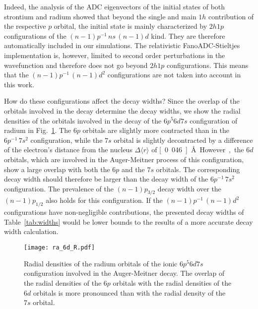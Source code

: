 \documentclass[aps,amssymb,preprint,a4paper,longbibliography]{revtex4}
\begin{document}
Indeed, the analysis of the ADC eigenvectors of the initial states of both
strontium and radium showed
that beyond the single and main $1h$ contribution of the respective $p$ orbital, the
initial state is mainly characterized by $2h1p$ configurations of the
$(n-1)p^{-1} \,ns \, (n-1)d$ kind. They
are therefore automatically included in our simulations.
The
{relativistic}
FanoADC-Stieltjes
{implementation}
is, however, limited
to second order perturbations in the wavefunction
and therefore does not go beyond $2h1p$ configurations. This means that the
$(n-1)p^{-1} \,(n-1)d^2$ configurations are not taken into account in this work.

How do these configurations affect the decay widths? Since the overlap of the
orbitals involved in the decay determine the decay widths, we show the
radial densities of the orbitals involved in the decay of the $6p^5 6d 7s$
configuration of radium in Fig.~\ref{fig:radial_ra}.
The $6p$ orbitals are slightly more contracted than in the $6p^{-1} \,7s^2$
configuration, while the $7s$ orbital is slightly decontracted by a difference
of the electron's distance from the nucleus $\Delta \langle r \rangle$
of \unit[0.046]{\AA}.
However, the $6d$ orbitals, which are involved
in the Auger-Meitner process of this configuration, show a large overlap with both
the $6p$ and the $7s$ orbitals. The corresponding decay width should therefore
be larger than the decay width of the $6p^{-1} \,7s^2$ configuration.
The prevalence of the $(n-1)p_{3/2}$ decay width over the $(n-1)p_{1/2}$
also holds for this configuration.
If the $(n-1)p^{-1} \,(n-1)d^2$ configurations
have non-negligible contributions,
the presented decay widths of Table~\ref{tab:widths} would be
lower bounds to the results of a more accurate decay width calculation.

\begin{figure}[h]
 \centering
 \texttt{[image: ra\_6d\_R.pdf]}
 \caption{Radial densities of the radium orbitals of the ionic $6p^5 6d 7s$
          configuration involved in the Auger-Meitner decay. The overlap of the radial
          densities of the $6p$ orbitals with the radial densities of the $6d$ orbitals
          is more pronounced than with the radial density of the $7s$ orbital.}
 \label{fig:radial_ra}
\end{figure}
\end{document}
